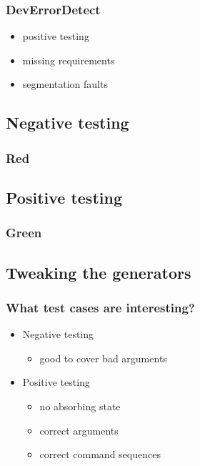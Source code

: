 \documentclass{beamer}
\begin{document}
\begin{frame}
  \frametitle{DevErrorDetect}
  \begin{itemize}
    \item positive testing
    \item missing requirements
    \item segmentation faults
  \end{itemize}
\end{frame}

\subsection{Negative testing}

\begin{frame}
  \frametitle{Red}
\end{frame}

\subsection{Positive testing}

\begin{frame}
  \frametitle{Green}
\end{frame}

\subsection{Tweaking the generators}

\begin{frame}
  \frametitle{What test cases are interesting?}
  \begin{itemize}
    \item Negative testing
    \begin{itemize}
      \item good to cover bad arguments
    \end{itemize}
    \item Positive testing
    \begin{itemize}
      \item no absorbing state
      \item correct arguments
      \item correct command sequences
    \end{itemize}
  \end{itemize}
\end{frame}
\end{document}
